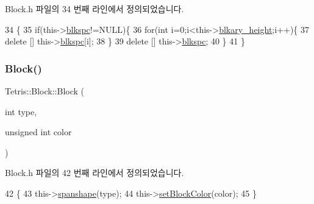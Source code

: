 Block.\+h 파일의 34 번째 라인에서 정의되었습니다.


\begin{DoxyCode}
34                 \{
35             \textcolor{keywordflow}{if}(this->\hyperlink{class_tetris_1_1_block_af2f96c83a3511d32321672f794aa4db1}{blkspc}!=NULL)\{
36                 \textcolor{keywordflow}{for}(\textcolor{keywordtype}{int} i=0;i<this->\hyperlink{class_tetris_1_1_block_abbea7737c2b1fb7339aab4dff13de27c}{blkary\_height};i++)\{
37                     \textcolor{keyword}{delete} [] this->\hyperlink{class_tetris_1_1_block_af2f96c83a3511d32321672f794aa4db1}{blkspc}[i];
38                 \}
39                 \textcolor{keyword}{delete} [] this->\hyperlink{class_tetris_1_1_block_af2f96c83a3511d32321672f794aa4db1}{blkspc};
40             \}
41         \}
\end{DoxyCode}
\mbox{\label{class_tetris_1_1_block_a82c3ff96d106bd1da7b32f2addd7db7f}} 
\subsubsection{\texorpdfstring{Block()}{Block()}\hspace{0.1cm}{\footnotesize\ttfamily [2/4]}}
{\footnotesize\ttfamily Tetris\+::\+Block\+::\+Block (\begin{DoxyParamCaption}\item[{int}]{type,  }\item[{unsigned int}]{color }\end{DoxyParamCaption})\hspace{0.3cm}{\ttfamily [inline]}}



Block.\+h 파일의 42 번째 라인에서 정의되었습니다.


\begin{DoxyCode}
42                                           \{
43             this->\hyperlink{class_tetris_1_1_block_ad683f161157c16b80d5df8929bca468c}{spanshape}(type);
44             this->\hyperlink{class_tetris_1_1_block_a1a3fab9e7eabe64a4ba588ed5091d3a9}{setBlockColor}(color);
45         \}
\end{DoxyCode}
\mbox{\label{class_tetris_1_1_block_a1fd0aaff1f4b622c9c7027929c5d4534}} 
